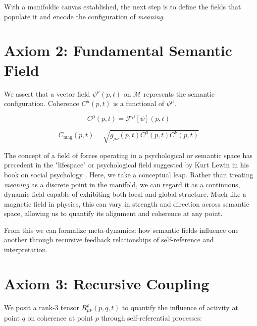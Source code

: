 With a manifoldic canvas established, the next step is to define the fields that populate it and encode the configuration of \textit{meaning}.


\section{Axiom 2: Fundamental Semantic Field}
\label{1.2:axiom_2_fundamental_semantic_field}

We assert that a vector field \(\psi^\mu(p,t)\) on \(\mathcal{M}\) represents the semantic configuration. Coherence \(C^\mu(p,t)\) is a functional of \(\psi^\mu\).

\begin{equation}
C^\mu(p,t) = \mathcal{F}^\mu[\psi](p,t)
\end{equation}

\begin{equation}
C_{\text{mag}}(p,t) = \sqrt{g_{\mu\nu}(p,t) C^\mu(p,t) C^\nu(p,t)}
\end{equation}

The concept of a field of forces operating in a psychological or semantic space has precedent in the "lifespace" or psychological field suggested by Kurt Lewin in his book on social psychology \autocite{Lewin1951}. Here, we take a conceptual leap. Rather than treating \textit{meaning} as a discrete point in the manifold, we can regard it as a continuous, dynamic field capable of exhibiting both local and global structure. Much like a magnetic field in physics, this can vary in strength and direction across semantic space, allowing us to quantify its alignment and coherence at any point.

From this we can formalize meta-dynamics: how semantic fields influence one another through recursive feedback relationships of self-reference and interpretation. 


\section{Axiom 3: Recursive Coupling}
\label{1.3:axiom_3_recursive_coupling}

We posit a rank-3 tensor \(R^\rho_{\mu\nu}(p,q,t)\) to quantify the influence of activity at point \(q\) on coherence at point \(p\) through self-referential processes:

